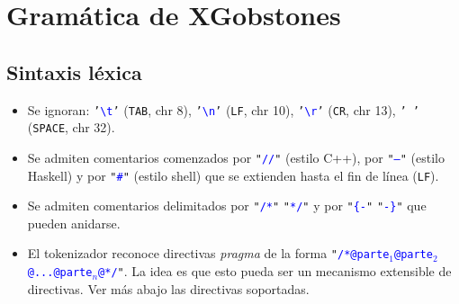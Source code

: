 \documentclass{article}
\begin{document}
\newcommand{\chr}[1]{\texttt{'}\textcolor{blue}{\texttt{#1}}\texttt{'}}
\newcommand{\str}[1]{\texttt{"}\textcolor{blue}{\texttt{#1}}\texttt{"}}
\newcommand{\tok}[1]{\textcolor{red}{\texttt{#1}}}
\newcommand{\symbolentry}[3]{#1 & #2 && #3 \\}
\newcommand{\nb}[1]{\footnotesize{#1}}
\newcommand{\NB}[1]{
  & {\footnotesize {#1}}
}
\newcommand{\s}[1]{\textcolor{blue}{{\it$\langle$#1$\rangle$}}}
\newcommand{\nonEmpty}[1]{#1$_{1}$}
\newcommand{\produccion}[2]{
  \noindent
  \begin{tabularx}{\textwidth}{lrlr}
  #1 & $\xrightarrow{\hspace{.5cm}}$ & #2
  \end{tabularx}\\
}
\newcommand{\EMPTY}{$\epsilon$}
\newcommand{\ALT}{
  \\ & $\mid$ &
}
\newcommand{\ALTA}{
  $\mid$
}
\newcommand{\TODO}[1]{\textcolor{red}{****#1****}}

\newcommand{\type}[1]{\textcolor{blue}{\texttt{#1}}}
\renewcommand{\ast}[1]{\textcolor{darkgreen}{\texttt{\underline{#1}}}}
\newcommand{\typedecl}[2]{\noindent
  \begin{tabularx}{\textwidth}{lrlr}
  #1 & $=$ & #2
  \end{tabularx}\\
}
\newcommand{\datadecl}[2]{\noindent
  \begin{tabularx}{\textwidth}{lrp{13cm}r}
  #1 & $::=$ & #2
  \end{tabularx}\\
}

\section{Gram\'atica de XGobstones}

\subsection{Sintaxis l\'exica}

\begin{itemize}
\item Se ignoran:
\chr{\textbackslash t} (\texttt{TAB}, chr 8),
\chr{\textbackslash n} (\texttt{LF}, chr 10),
\chr{\textbackslash r} (\texttt{CR}, chr 13),
\chr{\,} (\texttt{SPACE}, chr 32).
\item Se admiten comentarios comenzados por \str{//} (estilo C++), por \str{--} (estilo Haskell) y por \str{\#} (estilo shell) que se extienden hasta el fin de l\'inea (\texttt{LF}).
\item Se admiten comentarios delimitados por \str{/*} \str{*/} y por \str{\{-} \str{-\}} que pueden anidarse.
\item El tokenizador reconoce directivas {\em pragma} de la forma \str{/*@parte$_1$@parte$_2$@...@parte$_n$@*/}. La idea es que esto pueda ser un mecanismo extensible de directivas. Ver m\'as abajo las directivas soportadas.
\end{itemize}
\end{document}
